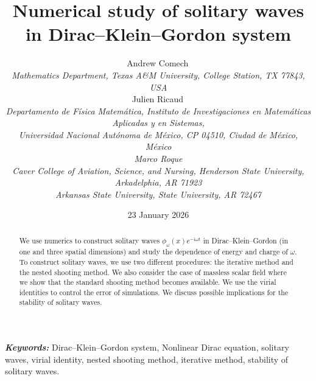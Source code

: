 \documentclass[12pt]{extarticle}
\def\version{23 January 2026}
\newcommand{\jj}{\mathrm{i}}
\theoremstyle{plain}
\theoremstyle{remark}
\renewcommand{\theequation}{\thesection.\arabic{equation}}
\providecommand{\keywords}[1]
{
\noindent
\small \textbf{\textit{Keywords:}} #1
}
\begin{document}
\renewcommand{\theequation}{\thesection.\arabic{equation}}
\newcommand{\sect}[1]{\setcounter{equation}{0}\section{#1}}


\title{Numerical study
of solitary waves\\in
Dirac--Klein--Gordon system
}


\author{
Andrew Comech\,
\\
{\small\it
Mathematics Department,
Texas A\&M University, College Station, TX 77843, USA}
\\[1ex]
Julien Ricaud\,
\\
\small\it
Departamento de F\'{i}sica Matem\'{a}tica,
Instituto de Investigaciones en Matem\'aticas Aplicadas y en Sistemas,
\\
\small\it
Universidad Nacional Aut\'onoma de M\'exico, CP 04510, Ciudad de M\'exico, M\'exico
\\[1ex]
Marco Roque
\\
\small\it
Caver College of Aviation, 
Science, and Nursing,
Henderson State University, Arkadelphia, AR 71923
\\
\small\it
Arkansas State University,
State University, AR 72467
}

\date{\version}

\maketitle

\keywords{
Dirac--Klein--Gordon system,
Nonlinear Dirac equation,
solitary waves,
virial identity,
nested shooting method,
iterative method,
stability of solitary waves.
}

\begin{abstract}
We use numerics to construct solitary waves
$\phi_\omega(x) e^{-\jj\omega t}$
in Dirac--Klein--Gordon 
(in one and three spatial dimensions)
and study the dependence of energy and charge of $\omega$.
To construct solitary waves,
we use two different procedures:
the iterative method
and the nested shooting method.
We also consider the case of massless scalar
field where we show that the
standard shooting method becomes available.
We use the virial identities
to control the error of simulations.
We discuss possible implications
for the stability
of solitary waves.
\end{abstract}
\end{document}
